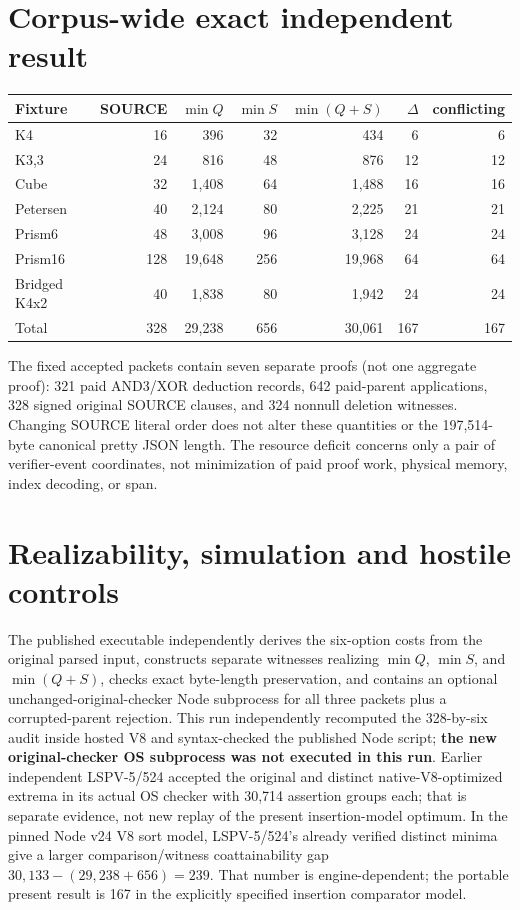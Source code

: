 \documentclass[11pt]{article}
\begin{document}
\section*{Corpus-wide exact independent result}
\begin{center}\begin{tabular}{@{}lrrrrrr@{}}\toprule
Fixture & SOURCE & $\min Q$ & $\min S$ & $\min(Q+S)$ & $\Delta$ & conflicting\\\midrule
K4 &16&396&32&434&6&6\\
K3,3 &24&816&48&876&12&12\\
Cube &32&1,408&64&1,488&16&16\\
Petersen &40&2,124&80&2,225&21&21\\
Prism6 &48&3,008&96&3,128&24&24\\
Prism16 &128&19,648&256&19,968&64&64\\
Bridged K4x2 &40&1,838&80&1,942&24&24\\\midrule
Total &328&29,238&656&30,061&167&167\\\bottomrule
\end{tabular}\end{center}
The fixed accepted packets contain seven separate proofs (not one aggregate proof): 321 paid AND3/XOR deduction records, 642 paid-parent applications, 328 signed original SOURCE clauses, and 324 nonnull deletion witnesses. Changing SOURCE literal order does not alter these quantities or the 197,514-byte canonical pretty JSON length. The resource deficit concerns only a pair of verifier-event coordinates, not minimization of paid proof work, physical memory, index decoding, or span.

\section*{Realizability, simulation and hostile controls}
The published executable independently derives the six-option costs from the original parsed input, constructs separate witnesses realizing \(\min Q\), \(\min S\), and \(\min(Q+S)\), checks exact byte-length preservation, and contains an optional unchanged-original-checker Node subprocess for all three packets plus a corrupted-parent rejection. This run independently recomputed the 328-by-six audit inside hosted V8 and syntax-checked the published Node script; \textbf{the new original-checker OS subprocess was not executed in this run}. Earlier independent LSPV-5/524 accepted the original and distinct native-V8-optimized extrema in its actual OS checker with 30,714 assertion groups each; that is separate evidence, not new replay of the present insertion-model optimum. In the pinned Node v24 V8 sort model, LSPV-5/524's already verified distinct minima give a larger comparison/witness coattainability gap \(30{,}133-(29{,}238+656)=239\). That number is engine-dependent; the portable present result is 167 in the explicitly specified insertion comparator model.
\end{document}
